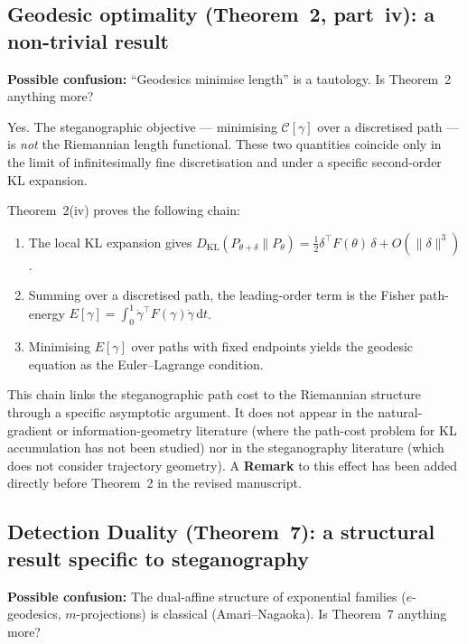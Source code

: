 \documentclass[12pt,a4paper]{article}
\newcommand{\DKL}{D_{\mathrm{KL}}}
\begin{document}
\subsection{Geodesic optimality (Theorem~2, part~iv): a non-trivial result}

\begin{editorbox}
\textbf{Possible confusion:}
``Geodesics minimise length'' is a tautology. Is Theorem~2 anything more?
\end{editorbox}

\begin{responsebox}
Yes.
The steganographic objective --- minimising $\mathcal{C}[\gamma]$ over a
discretised path --- is \emph{not} the Riemannian length functional.
These two quantities coincide only in the limit of infinitesimally fine
discretisation and under a specific second-order KL expansion.

Theorem~2(iv) proves the following chain:
\begin{enumerate}[nosep]
  \item The local KL expansion gives
        $\DKL(P_{\theta+\delta}\|P_{\theta})
         = \tfrac{1}{2}\delta^\top F(\theta)\,\delta + O(\|\delta\|^3)$.
  \item Summing over a discretised path, the leading-order term is the
        Fisher path-energy
        $E[\gamma]=\int_0^1\dot\gamma^\top F(\gamma)\dot\gamma\,\mathrm{d}t$.
  \item Minimising $E[\gamma]$ over paths with fixed endpoints yields the
        geodesic equation as the Euler--Lagrange condition.
\end{enumerate}
This chain links the steganographic path cost to the Riemannian structure
through a specific asymptotic argument.
It does not appear in the natural-gradient or information-geometry literature
(where the path-cost problem for KL accumulation has not been studied) nor
in the steganography literature (which does not consider trajectory geometry).
A \textbf{Remark} to this effect has been added directly before Theorem~2 in
the revised manuscript.
\end{responsebox}

\subsection{Detection Duality (Theorem~7): a structural result specific to steganography}

\begin{editorbox}
\textbf{Possible confusion:}
The dual-affine structure of exponential families ($e$-geodesics, $m$-projections)
is classical (Amari--Nagaoka). Is Theorem~7 anything more?
\end{editorbox}
\end{document}
